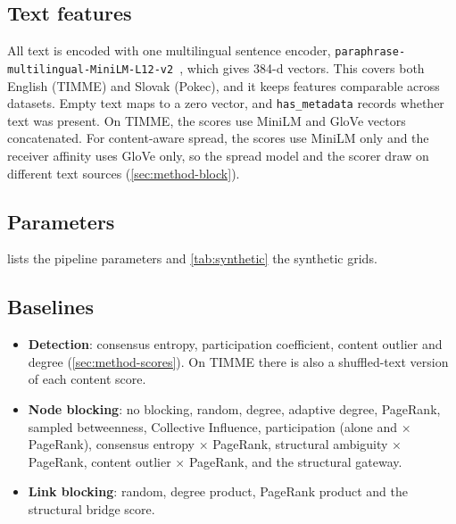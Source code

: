 \subsection{Text features}
\label{sec:setup-features}
All text is encoded with one multilingual sentence encoder,
\texttt{paraphrase-\allowbreak multilingual-\allowbreak MiniLM-\allowbreak L12-\allowbreak v2}~\citep{reimers2020multilingual}, which
gives 384-d vectors. This covers both English (TIMME) and Slovak (Pokec), and it keeps
features comparable across datasets. Empty text maps to a zero vector, and
\texttt{has\_metadata} records whether text was present. On TIMME, the scores use
MiniLM and GloVe vectors concatenated. For content-aware spread, the scores use MiniLM
only and the receiver affinity uses GloVe only, so the spread model and the scorer
draw on different text sources (\cref{sec:method-block}).

\subsection{Parameters}
 lists the pipeline parameters and \cref{tab:synthetic} the synthetic
grids.




\subsection{Baselines}
\begin{itemize}
  \item \textbf{Detection}: consensus entropy, participation coefficient, content
        outlier and degree (\cref{sec:method-scores}). On TIMME there is also a
        shuffled-text version of each content score.
  \item \textbf{Node blocking}: no blocking, random, degree, adaptive degree,
        PageRank, sampled betweenness, Collective Influence, participation (alone and
        $\times$ PageRank), consensus entropy $\times$ PageRank, structural ambiguity
        $\times$ PageRank, content outlier $\times$ PageRank, and the structural gateway.
  \item \textbf{Link blocking}: random, degree product, PageRank product and the
        structural bridge score.
\end{itemize}

